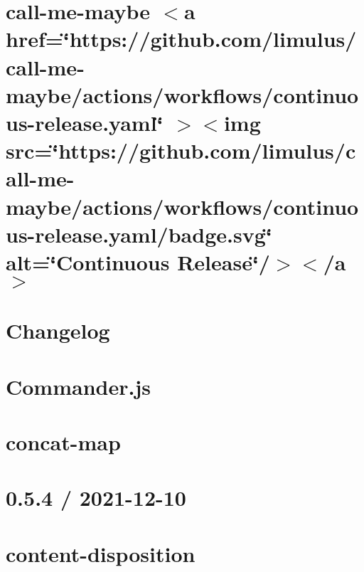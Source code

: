 \documentclass[twoside]{book}
\newcommand{\+}{\discretionary{\mbox{\scriptsize$\hookleftarrow$}}{}{}}
\begin{document}
\chapter{call-\/me-\/maybe \texorpdfstring{$<$}{<}a href=\char`\"{}https\+://github.\+com/limulus/call-\/me-\/maybe/actions/workflows/continuous-\/release.\+yaml\char`\"{} \texorpdfstring{$>$}{>}\texorpdfstring{$<$}{<}img src=\char`\"{}https\+://github.\+com/limulus/call-\/me-\/maybe/actions/workflows/continuous-\/release.\+yaml/badge.\+svg\char`\"{} alt=\char`\"{}\+Continuous Release\char`\"{}/\texorpdfstring{$>$}{>}\texorpdfstring{$<$}{<}/a\texorpdfstring{$>$}{>}}
\label{md_src_nodejs_node_modules_call_me_maybe_README}

\chapter{Changelog}
\label{md_src_nodejs_node_modules_commander_CHANGELOG}

\chapter{Commander.\+js}
\label{md_src_nodejs_node_modules_commander_Readme}

\chapter{concat-\/map}
\label{md_src_nodejs_node_modules_concat_map_README}

\chapter{0.5.4 / 2021-\/12-\/10}
\label{md_src_nodejs_node_modules_content_disposition_HISTORY}

\chapter{content-\/disposition}
\label{md_src_nodejs_node_modules_content_disposition_README}

\end{document}
